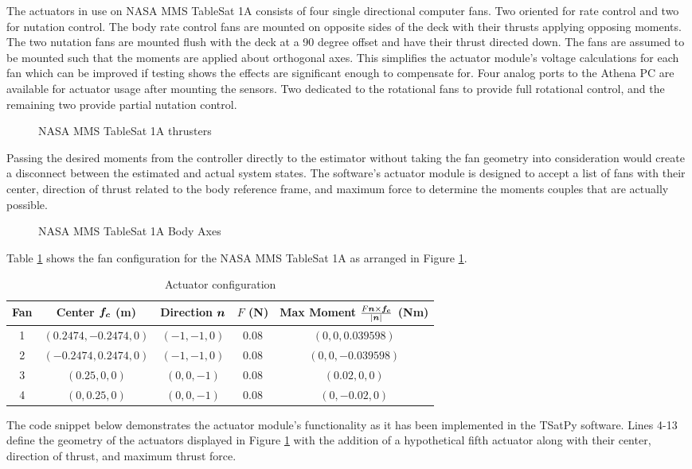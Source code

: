 The actuators in use on NASA MMS TableSat 1A consists of four single directional computer fans.  Two oriented for rate control and two for nutation control.  The body rate control fans are mounted on opposite sides of the deck with their thrusts applying opposing moments.  The two nutation fans are mounted flush with the deck at a 90 degree offset and have their thrust directed down.  The fans are assumed to be mounted such that the moments are applied about orthogonal axes.  This simplifies the actuator module's voltage calculations for each fan which can be improved if testing shows the effects are significant enough to compensate for.  Four analog ports to the Athena PC are available for actuator usage after mounting the sensors.  Two dedicated to the rotational fans to provide full rotational control, and the remaining two provide partial nutation control.
\begin{figure}[H]
  \centerline{}
  \caption{NASA MMS TableSat 1A thrusters}
  \label{fig:TSatThrusters}
\end{figure}
Passing the desired moments from the controller directly to the estimator without taking the fan geometry into consideration would create a disconnect between the estimated and actual system states.  The software's actuator module is designed to accept a list of fans with their center, direction of thrust related to the body reference frame, and maximum force to determine the moments couples that are actually possible.
\begin{figure}[H]
  \centerline{}
  \caption{NASA MMS TableSat 1A Body Axes}
  \label{fig:TableSatBodyAxes}
\end{figure}
Table \ref{tbl:ActuatorConfiguration} shows the fan configuration for the NASA MMS TableSat 1A as arranged in Figure \ref{fig:TSatThrusters}.
\begin{table}[H]
  \centering
  \begin{tabular}{c|c|c|c|c}
    Fan & Center $\boldsymbol{f_c}$ (m) & Direction $\boldsymbol{n}$ & $F$ (N) & Max Moment $\frac{F \boldsymbol{n} \times \boldsymbol{f_c}}{|\boldsymbol{n}|}$ (Nm) \\ \hline
    1 & $(0.2474, -0.2474, 0)$ & $(-1, -1, 0)$ & 0.08 & $(0, 0, 0.039598)$ \\
    2 & $(-0.2474, 0.2474, 0)$ & $(-1, -1, 0)$ & 0.08 & $(0, 0, -0.039598)$ \\
    3 & $(0.25, 0, 0)$ & $(0, 0, -1)$ & 0.08 & $(0.02, 0, 0)$ \\
    4 & $(0, 0.25, 0)$ & $(0, 0, -1)$ & 0.08 & $(0, -0.02, 0)$ \\
  \end{tabular}
  \caption{Actuator configuration}
  \label{tbl:ActuatorConfiguration}
\end{table}
The code snippet below demonstrates the actuator module's functionality as it has been implemented in the TSatPy software.  Lines 4-13 define the geometry of the actuators displayed in Figure \ref{fig:TSatThrusters} with the addition of a hypothetical fifth actuator along with their center, direction of thrust, and maximum thrust force.

